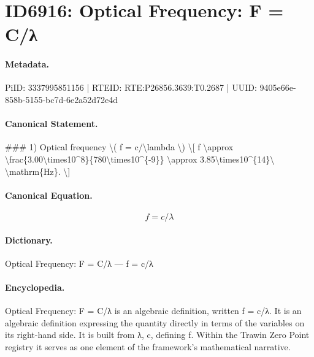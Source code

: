 \section*{ID6916: Optical Frequency: F = C/λ}
\paragraph{Metadata.}
PiID: 3337995851156 | RTEID: RTE:P26856.3639:T0.2687 | UUID: 9405e66e-858b-5155-bc7d-6e2a52d72e4d

\paragraph{Canonical Statement.}
\#\#\# 1) Optical frequency \textbackslash{}( f = c/\textbackslash{}lambda \textbackslash{}) \textbackslash{}[ f \textbackslash{}approx \textbackslash{}frac\{3.00\textbackslash{}times10\textasciicircum{}8\}\{780\textbackslash{}times10\textasciicircum{}\{-9\}\} \textbackslash{}approx 3.85\textbackslash{}times10\textasciicircum{}\{14\}\textbackslash{} \textbackslash{}mathrm\{Hz\}. \textbackslash{}]

\paragraph{Canonical Equation.}
\[
f = c/\lambda
\]

\paragraph{Dictionary.}
Optical Frequency: F = C/λ — f = c/λ

\paragraph{Encyclopedia.}
Optical Frequency: F = C/λ is an algebraic definition, written f = c/λ. It is an algebraic definition expressing the quantity directly in terms of the variables on its right-hand side. It is built from λ, c, defining f. Within the Trawin Zero Point registry it serves as one element of the framework's mathematical narrative.
